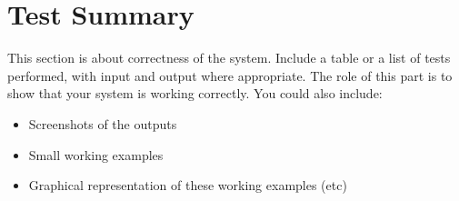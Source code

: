 \documentclass[letterpaper,12pt]{article}
\begin{document}
\section{Test Summary}
\label{sec:test-summary}

This section is about correctness of the system. Include a table or a list of tests performed, with input and output where appropriate. The role of this part is to show that your system is working correctly. You could also include:

\begin{itemize}
    \item Screenshots of the outputs
    \item Small working examples
    \item Graphical representation of these working examples (etc)
\end{itemize}

\end{document}
